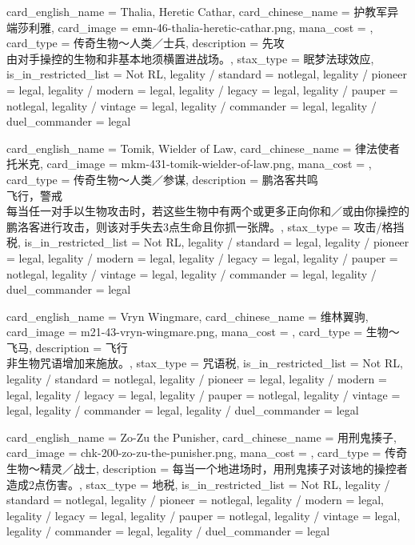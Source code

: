 \documentclass[lang = cn, color = black, 10pt]{AllThatStax}
\begin{document}
\card
{
	card_english_name = {Thalia, Heretic Cathar},
	card_chinese_name = {护教军异端莎利雅},
	card_image = emn-46-thalia-heretic-cathar.png,
	mana_cost = ,
	card_type = 传奇生物～人类／士兵,
	description = {先攻\\
由对手操控的生物和非基本地须横置进战场。},
	stax_type = 眠梦法球效应,
	is_in_restricted_list = Not RL,
	legality / standard = notlegal,
	legality / pioneer = legal,
	legality / modern = legal,
	legality / legacy = legal,
	legality / pauper = notlegal,
	legality / vintage = legal,
	legality / commander = legal,
	legality / duel_commander = legal
}

\card
{
	card_english_name = {Tomik, Wielder of Law},
	card_chinese_name = {律法使者托米克},
	card_image = mkm-431-tomik-wielder-of-law.png,
	mana_cost = ,
	card_type = 传奇生物～人类／参谋,
	description = {鹏洛客共鸣\\
飞行，警戒\\
每当任一对手以生物攻击时，若这些生物中有两个或更多正向你和／或由你操控的鹏洛客进行攻击，则该对手失去3点生命且你抓一张牌。},
	stax_type = 攻击/格挡税,
	is_in_restricted_list = Not RL,
	legality / standard = legal,
	legality / pioneer = legal,
	legality / modern = legal,
	legality / legacy = legal,
	legality / pauper = notlegal,
	legality / vintage = legal,
	legality / commander = legal,
	legality / duel_commander = legal
}

\card
{
	card_english_name = {Vryn Wingmare},
	card_chinese_name = {维林翼驹},
	card_image = m21-43-vryn-wingmare.png,
	mana_cost = ,
	card_type = 生物～飞马,
	description = {飞行\\
非生物咒语增加来施放。},
	stax_type = 咒语税,
	is_in_restricted_list = Not RL,
	legality / standard = notlegal,
	legality / pioneer = legal,
	legality / modern = legal,
	legality / legacy = legal,
	legality / pauper = notlegal,
	legality / vintage = legal,
	legality / commander = legal,
	legality / duel_commander = legal
}

\card
{
	card_english_name = {Zo-Zu the Punisher},
	card_chinese_name = {用刑鬼揍子},
	card_image = chk-200-zo-zu-the-punisher.png,
	mana_cost = ,
	card_type = 传奇生物～精灵／战士,
	description = {每当一个地进场时，用刑鬼揍子对该地的操控者造成2点伤害。},
	stax_type = 地税,
	is_in_restricted_list = Not RL,
	legality / standard = notlegal,
	legality / pioneer = notlegal,
	legality / modern = legal,
	legality / legacy = legal,
	legality / pauper = notlegal,
	legality / vintage = legal,
	legality / commander = legal,
	legality / duel_commander = legal
}
\end{document}
